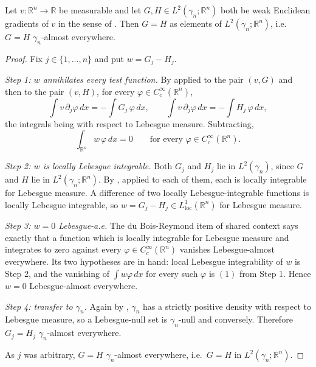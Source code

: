 \begin{lemma}
Let $v : \mathbb{R}^n \to \mathbb{R}$ be measurable and let
$G, H \in L^2(\gamma_n;\mathbb{R}^n)$ both be weak Euclidean gradients of $v$ in
the sense of .  Then $G = H$ as elements of
$L^2(\gamma_n;\mathbb{R}^n)$, i.e. $G = H$ $\gamma_n$-almost everywhere.
\end{lemma}
\begin{proof}
Fix $j \in \{1,\ldots,n\}$ and put $w = G_j - H_j$.

\emph{Step 1: $w$ annihilates every test function.}
By  applied to the pair $(v,G)$ and then to the pair
$(v,H)$, for every $\varphi \in C_c^\infty(\mathbb{R}^n)$,
\[
  \int v\,\partial_j\varphi\, dx = -\int G_j\,\varphi\, dx,
  \qquad
  \int v\,\partial_j\varphi\, dx = -\int H_j\,\varphi\, dx ,
\]
the integrals being with respect to Lebesgue measure.  Subtracting,
\begin{equation*}
  \int_{\mathbb{R}^n} w\,\varphi\, dx = 0
  \qquad\text{for every } \varphi \in C_c^\infty(\mathbb{R}^n). \tag{1}
\end{equation*}

\emph{Step 2: $w$ is locally Lebesgue integrable.}
Both $G_j$ and $H_j$ lie in $L^2(\gamma_n)$, since $G$ and $H$ lie in
$L^2(\gamma_n;\mathbb{R}^n)$.  By , applied to
each of them, each is locally integrable for Lebesgue measure.  A difference of
two locally Lebesgue-integrable functions is locally Lebesgue integrable, so
$w = G_j - H_j \in L^1_{\mathrm{loc}}(\mathbb{R}^n)$ for Lebesgue measure.

\emph{Step 3: $w = 0$ Lebesgue-a.e.}
The du Bois-Reymond item of shared context says exactly that a function which is
locally integrable for Lebesgue measure and integrates to zero against every
$\varphi \in C_c^\infty(\mathbb{R}^n)$ vanishes Lebesgue-almost everywhere.  Its
two hypotheses are in hand: local Lebesgue integrability of $w$ is Step 2, and
the vanishing of $\int w \varphi \, dx$ for every such $\varphi$ is $(1)$ from
Step 1.  Hence $w = 0$ Lebesgue-almost everywhere.

\emph{Step 4: transfer to $\gamma_n$.}
Again by , $\gamma_n$ has a strictly positive density with
respect to Lebesgue measure, so a Lebesgue-null set is $\gamma_n$-null and
conversely.  Therefore $G_j = H_j$ $\gamma_n$-almost everywhere.

As $j$ was arbitrary, $G = H$ $\gamma_n$-almost everywhere, i.e.\ $G = H$ in
$L^2(\gamma_n;\mathbb{R}^n)$.
\end{proof}
